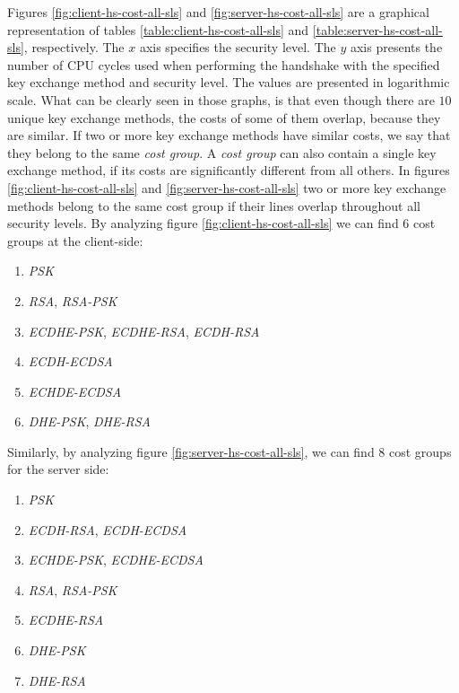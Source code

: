 Figures \ref{fig:client-hs-cost-all-sls} and \ref{fig:server-hs-cost-all-sls} are a graphical representation of tables \ref{table:client-hs-cost-all-sls}
and \ref{table:server-hs-cost-all-sls}, respectively. The $x$ axis specifies the security level. The $y$ axis presents the number
of CPU cycles used when performing the handshake with the specified key exchange method and security level.
The values are presented in logarithmic scale.  What can be clearly seen in those
graphs, is that even though there are $10$ unique key exchange methods, the costs of some of them overlap, because they are similar.
If two or more key exchange methods have similar costs, we say that they belong to the same \textit{cost group}. A \textit{cost group}
can also contain a single key exchange method, if its costs are significantly different from all others. In figures
\ref{fig:client-hs-cost-all-sls} and \ref{fig:server-hs-cost-all-sls} two or more key exchange methods belong to the same
cost group if their lines overlap throughout all security levels. By analyzing figure \ref{fig:client-hs-cost-all-sls} we can
find $6$ cost groups at the client-side:

\begin{enumerate}
  \item \textit{PSK}
  \item \textit{RSA}, \textit{RSA-PSK}
  \item \textit{ECDHE-PSK}, \textit{ECDHE-RSA}, \textit{ECDH-RSA}
  \item \textit{ECDH-ECDSA}
  \item \textit{ECHDE-ECDSA}
  \item \textit{DHE-PSK}, \textit{DHE-RSA}
\end{enumerate}

Similarly, by analyzing figure \ref{fig:server-hs-cost-all-sls}, we can find $8$ cost groups for the server side:

\begin{enumerate}
  \item \textit{PSK}
  \item \textit{ECDH-RSA}, \textit{ECDH-ECDSA}
  \item \textit{ECHDE-PSK}, \textit{ECDHE-ECDSA}
  \item \textit{RSA}, \textit{RSA-PSK}
  \item \textit{ECDHE-RSA}
  \item \textit{DHE-PSK}
  \item \textit{DHE-RSA}
\end{enumerate}

